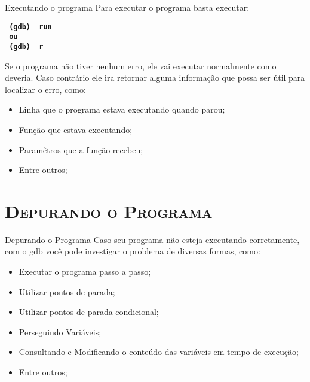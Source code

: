 \begin{frame}{Executando o programa}
    Para executar o programa basta executar:
    \begin{center}
        \small
        \texttt{ \textbf{ (gdb) {\color{dartmouthgreen} run}}}
        \\ \texttt{ \textbf{ ou } } \\
        \texttt{ \textbf{ (gdb) {\color{dartmouthgreen} r}}}
    \end{center}
    
    Se o programa não tiver nenhum erro, ele vai executar normalmente como deveria. Caso contrário ele ira retornar alguma informação que possa ser útil para localizar o erro, como:
    
    \begin{itemize}
        \item Linha que o programa estava executando quando parou;
        \item Função que estava executando;
        \item Paramêtros que a função recebeu;
        \item Entre outros;
    \end{itemize}
\end{frame}

\section{ \scshape Depurando o Programa }
\frame{\tableofcontents[
    currentsection,
    currentsubsection,
    subsectionstyle=show/shaded/hide
]}
\begin{frame}{ Depurando o Programa }
    Caso seu programa não esteja executando corretamente, com o gdb você pode investigar o problema de diversas formas, como:
    \begin{itemize}
        \item Executar o programa passo a passo;
        \item Utilizar pontos de parada;
        \item Utilizar pontos de parada condicional;
        \item Perseguindo Variáveis;
        \item Consultando e Modificando o conteúdo das variáveis em tempo de execução;
        \item Entre outros;
    \end{itemize}
\end{frame}

